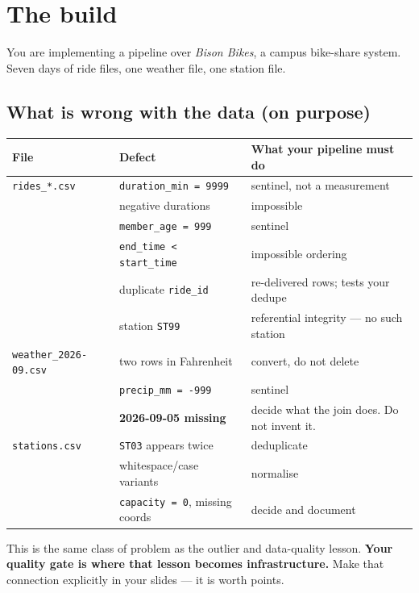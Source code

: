\documentclass[11pt]{article}
\newcommand{\key}[1]{\textcolor{accent}{\textbf{#1}}}
\begin{document}
\section{The build}

You are implementing a pipeline over \textit{Bison Bikes}, a campus bike-share
system. Seven days of ride files, one weather file, one station file.

\subsection{What is wrong with the data (on purpose)}

\begin{center}
\small
\begin{tabular}{@{}llp{}@{}}
\toprule
\textbf{File} & \textbf{Defect} & \textbf{What your pipeline must do} \\
\midrule
\texttt{rides\_*.csv} & \texttt{duration\_min = 9999} & sentinel, not a measurement \\
 & negative durations & impossible \\
 & \texttt{member\_age = 999} & sentinel \\
 & \texttt{end\_time < start\_time} & impossible ordering \\
 & duplicate \texttt{ride\_id} & re-delivered rows; tests your dedupe \\
 & station \texttt{ST99} & referential integrity --- no such station \\
\addlinespace
\texttt{weather\_2026-09.csv} & two rows in Fahrenheit & convert, do not delete \\
 & \texttt{precip\_mm = -999} & sentinel \\
 & \textbf{2026-09-05 missing} & decide what the join does. Do not invent it. \\
\addlinespace
\texttt{stations.csv} & \texttt{ST03} appears twice & deduplicate \\
 & whitespace/case variants & normalise \\
 & \texttt{capacity = 0}, missing coords & decide and document \\
\bottomrule
\end{tabular}
\end{center}

\begin{dobox}
This is the same class of problem as the outlier and data-quality lesson.
\key{Your quality gate is where that lesson becomes infrastructure.} Make that
connection explicitly in your slides --- it is worth points.
\end{dobox}
\end{document}
